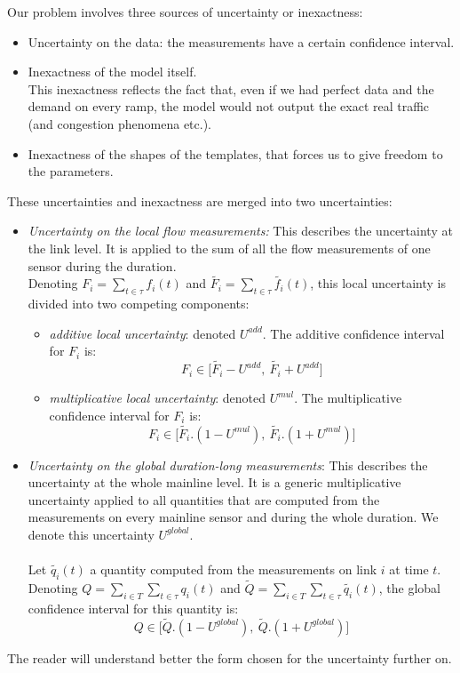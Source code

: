 Our problem involves three sources of uncertainty or inexactness:
\begin{itemize}
	\item Uncertainty on the data: the measurements have a certain confidence interval.
	\item Inexactness of the model itself.\\
	This inexactness reflects the fact that, even if we had perfect data and the demand on every ramp, the model would not output the exact real traffic (and congestion phenomena etc.).
	\item Inexactness of the shapes of the templates, that forces us to give freedom to the parameters.
\end{itemize}
These uncertainties and inexactness are merged into two uncertainties:
\begin{itemize}
	\item \emph{Uncertainty on the local flow measurements:} This describes the uncertainty at the link level. It is applied to the sum of all the flow measurements of one sensor during the duration.\\
	Denoting $F_{i}=\sum\limits_{t\in\tau}f_{i}(t)$ and $\widetilde{F_{i}}=\sum\limits_{t\in\tau}\widetilde{f_{i}}(t)$, this local uncertainty is divided into two competing components:
	\begin{itemize}
		\item \emph{additive local uncertainty}: denoted $U^{add}$. The additive confidence interval for $F_{i}$ is:
		\begin{equation*}
			F_{i}\in\big[\widetilde{F_{i}}-U^{add},\ \widetilde{F_{i}}+U^{add}\big]
		\end{equation*}		
		\item \emph{multiplicative local uncertainty}: denoted $U^{mul}$. The multiplicative confidence interval for $F_{i}$ is:
		\begin{equation*}
		 	F_{i}\in\big[\widetilde{F_{i}}.(1-U^{mul}),\ \widetilde{F_{i}}.(1+U^{mul})\big]
		\end{equation*}
	\end{itemize}
	\item \emph{Uncertainty on the global duration-long measurements}: This describes the uncertainty at the whole mainline level. It is a generic multiplicative uncertainty applied to all quantities that are computed from the measurements on every mainline sensor and during the whole duration. We denote this uncertainty $U^{global}$.\\
\\
Let $\widetilde{q_{i}}(t)$ a quantity computed from the measurements on link $i$ at time $t$. Denoting $Q=\sum\limits_{i\in T}\sum\limits_{t\in\tau}q_{i}(t)$ and $\widetilde{Q}=\sum\limits_{i\in T}\sum\limits_{t\in\tau}\widetilde{q_{i}}(t)$, the global confidence interval for this quantity is:\\
	\begin{equation*}
		 Q\in \big[\widetilde{Q}.(1-U^{global}),\ \widetilde{Q}.(1+U^{global})\big]
	\end{equation*}	
\end{itemize}
The reader will understand better the form chosen for the uncertainty further on.